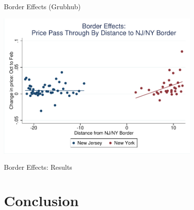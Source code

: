 \documentclass[xcolor=table]{beamer}
\begin{document}
\begin{spacing}{1.2}
\begin{frame}{Border Effects \small{(Grubhub})}

\centering
\includegraphics[width=4in]{gh_dist.pdf}
\end{frame}

%

\begin{frame}{Border Effects: Results}
\centering
\tiny


\end{frame}

%

\section{Conclusion}




\end{spacing}
\end{document}
